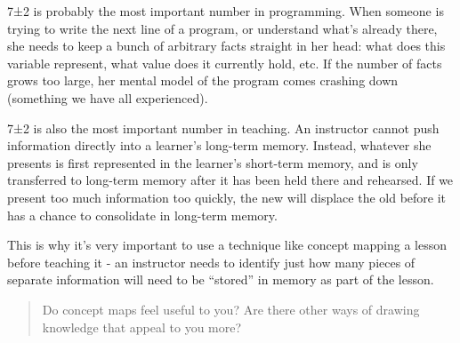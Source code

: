 7±2 is probably the most important number in programming. When someone
is trying to write the next line of a program, or understand what's
already there, she needs to keep a bunch of arbitrary facts straight in
her head: what does this variable represent, what value does it
currently hold, etc. If the number of facts grows too large, her mental
model of the program comes crashing down (something we have all
experienced).

7±2 is also the most important number in teaching. An instructor cannot
push information directly into a learner's long-term memory. Instead,
whatever she presents is first represented in the learner's short-term
memory, and is only transferred to long-term memory after it has been
held there and rehearsed. If we present too much information too
quickly, the new will displace the old before it has a chance to
consolidate in long-term memory.

This is why it's very important to use a technique like concept mapping
a lesson before teaching it - an instructor needs to identify just how
many pieces of separate information will need to be ``stored'' in memory
as part of the lesson.

\begin{quote}
Do concept maps feel useful to you? Are there other ways of drawing
knowledge that appeal to you more?
\end{quote}
